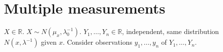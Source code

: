 \documentclass{article}[12pt]
\begin{document}
\begin{enumerate}
\end{enumerate}
\section{Multiple measurements}
$X \in \mathbb{R}$. $X \sim N(\mu_x,\lambda_0^{-1})$. $Y_1,\ldots,Y_n \in \mathbb{R}$, independent, same distribution $N(x,\lambda^{-1})$ given $x$. Consider observations $y_1,\ldots,y_n$ of $Y_1,\ldots,Y_n$.   
\end{document}
